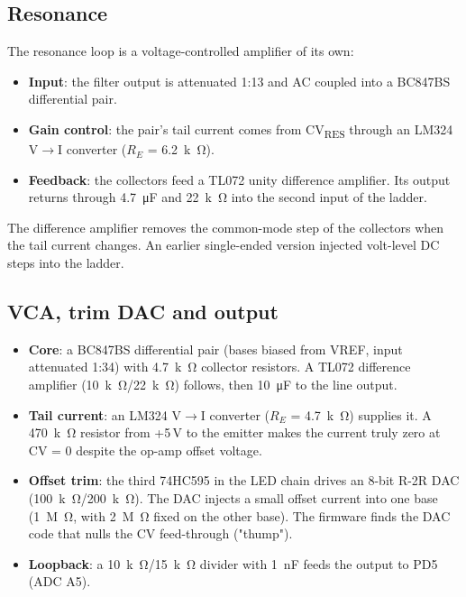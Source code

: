 \documentclass[11pt,a4paper]{article}
\newcommand{\sub}[1]{\textsubscript{#1}}
\begin{document}
\subsection{Resonance}
The resonance loop is a voltage-controlled amplifier of its own:
\begin{itemize}
  \item \textbf{Input}: the filter output is attenuated 1:13 and AC coupled into a BC847BS differential
    pair.
  \item \textbf{Gain control}: the pair's tail current comes from CV\sub{RES} through an LM324 V$\to$I
    converter ($R_E$ = \SI{6.2}{k\ohm}).
  \item \textbf{Feedback}: the collectors feed a TL072 unity difference amplifier. Its output returns
    through \SI{4.7}{\micro F} and \SI{22}{k\ohm} into the second input of the ladder.
\end{itemize}
The difference amplifier removes the common-mode step of the collectors when the tail current changes. An
earlier single-ended version injected volt-level DC steps into the ladder.

\subsection{VCA, trim DAC and output}
\begin{itemize}
  \item \textbf{Core}: a BC847BS differential pair (bases biased from VREF, input attenuated 1:34) with
    \SI{4.7}{k\ohm} collector resistors. A TL072 difference amplifier (\SI{10}{k\ohm}/\SI{22}{k\ohm})
    follows, then \SI{10}{\micro F} to the line output.
  \item \textbf{Tail current}: an LM324 V$\to$I converter ($R_E$ = \SI{4.7}{k\ohm}) supplies it. A
    \SI{470}{k\ohm} resistor from +5\,V to the emitter makes the current truly zero at CV = 0 despite the
    op-amp offset voltage.
  \item \textbf{Offset trim}: the third 74HC595 in the LED chain drives an 8-bit R-2R DAC
    (\SI{100}{k\ohm}/\SI{200}{k\ohm}). The DAC injects a small offset current into one base
    (\SI{1}{M\ohm}, with \SI{2}{M\ohm} fixed on the other base). The firmware finds the DAC code that nulls
    the CV feed-through ("thump").
  \item \textbf{Loopback}: a \SI{10}{k\ohm}/\SI{15}{k\ohm} divider with \SI{1}{nF} feeds the output to PD5
    (ADC A5).
\end{itemize}
\end{document}
